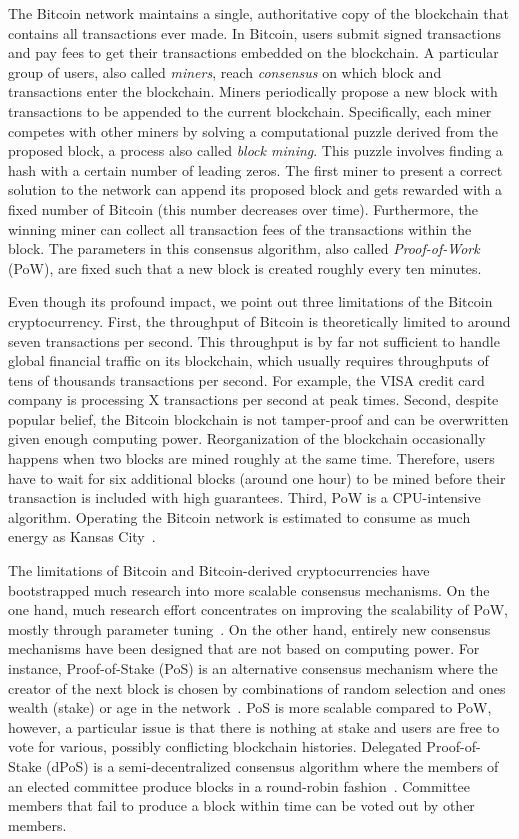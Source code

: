 The Bitcoin network maintains a single, authoritative copy of the blockchain that contains all transactions ever made.
In Bitcoin, users submit signed transactions and pay fees to get their transactions embedded on the blockchain.
A particular group of users, also called \emph{miners}, reach \emph{consensus} on which block and transactions enter the blockchain.
Miners periodically propose a new block with transactions to be appended to the current blockchain.
Specifically, each miner competes with other miners by solving a computational puzzle derived from the proposed block, a process also called \emph{block mining}.
This puzzle involves finding a hash with a certain number of leading zeros.
The first miner to present a correct solution to the network can append its proposed block and gets rewarded with a fixed number of Bitcoin (this number decreases over time).
Furthermore, the winning miner can collect all transaction fees of the transactions within the block.
The parameters in this consensus algorithm, also called \emph{Proof-of-Work} (PoW), are fixed such that a new block is created roughly every ten minutes.

Even though its profound impact, we point out three limitations of the Bitcoin cryptocurrency.
First, the throughput of Bitcoin is theoretically limited to around seven transactions per second.
This throughput is by far not sufficient to handle global financial traffic on its blockchain, which usually requires throughputs of tens of thousands transactions per second.
For example, the VISA credit card company is processing X transactions per second at peak times.
Second, despite popular belief, the Bitcoin blockchain is not tamper-proof and can be overwritten given enough computing power.
Reorganization of the blockchain occasionally happens when two blocks are mined roughly at the same time.
Therefore, users have to wait for six additional blocks (around one hour) to be mined before their transaction is included with high guarantees.
Third, PoW is a CPU-intensive algorithm.
Operating the Bitcoin network is estimated to consume as much energy as Kansas City~\cite{stoll2019carbon}.

The limitations of Bitcoin and Bitcoin-derived cryptocurrencies have bootstrapped much research into more scalable consensus mechanisms.
On the one hand, much research effort concentrates on improving the scalability of PoW, mostly through parameter tuning~\cite{karame2016security}.
On the other hand, entirely new consensus mechanisms have been designed that are not based on computing power.
For instance, Proof-of-Stake (PoS) is an alternative consensus mechanism where the creator of the next block is chosen by combinations of random selection and ones wealth (stake) or age in the network~\cite{king2012ppcoin}.
PoS is more scalable compared to PoW, however, a particular issue is that there is nothing at stake and users are free to vote for various, possibly conflicting blockchain histories.
Delegated Proof-of-Stake (dPoS) is a semi-decentralized consensus algorithm where the members of an elected committee produce blocks in a round-robin fashion~\cite{larimer2014delegated}.
Committee members that fail to produce a block within time can be voted out by other members.

